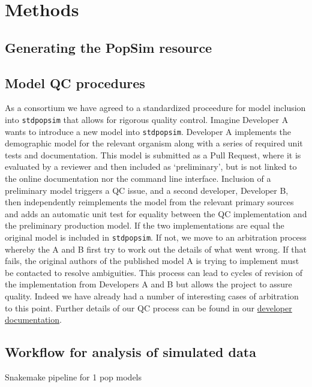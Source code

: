 \documentclass[12pt,halfline,a4paper]{ouparticle}
\newcommand{\stdpopsim}{\texttt{stdpopsim}\xspace}
\begin{document}
\section*{Methods}
\subsection*{Generating the PopSim resource}

\subsection*{Model QC procedures}
As a consortium we have agreed to a standardized proceedure for model inclusion
into \stdpopsim that allows for rigorous quality control. Imagine Developer A
wants to introduce a new model into \stdpopsim. Developer A implements the
demographic model for the relevant organism along with a series of required
unit tests and documentation. This model is submitted as a Pull Request,
where it is evaluated by a reviewer and then included as `preliminary',
but is not linked to the online documentation nor the command line interface.
Inclusion of a preliminary model triggers a QC issue, and a second developer,
Developer B, then independently reimplements the model from the relevant
primary sources and adds an automatic unit test for equality between the
QC implementation and the preliminary production model. If the two
implementations are equal the original model is included in \stdpopsim.
If not, we move to an arbitration process whereby the A and B first try
to work out the details of what went wrong. If that fails, the original
authors of the published model A is trying to implement must be contacted
to resolve ambiguities. This process can lead to cycles of revision of
the implementation from Developers A and B but allows the project to assure
quality. Indeed we have already had a number of interesting cases of arbitration
to this point. Further details of our QC process can be found in our
\href{https://stdpopsim.readthedocs.io/en/latest/development.html#}{developer documentation}.

\subsection*{Workflow for analysis of simulated data}
Snakemake pipeline for 1 pop models
\end{document}
